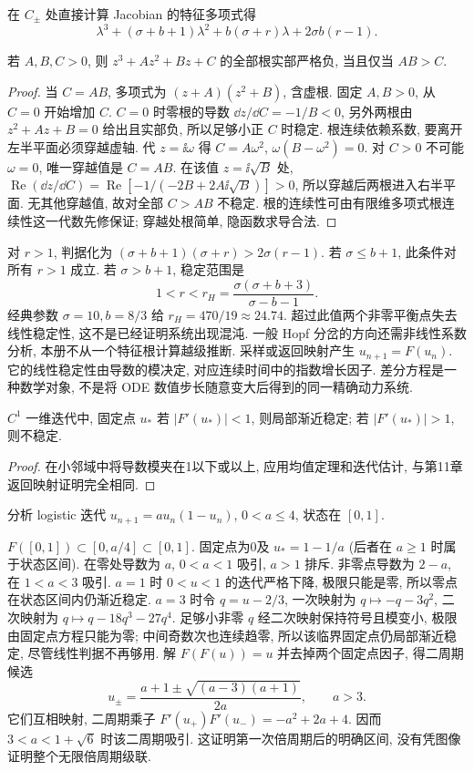 在 $C_\pm$ 处直接计算 Jacobian 的特征多项式得
\[
\lambda^3+(\sigma+b+1)\lambda^2+b(\sigma+r)\lambda+2\sigma b(r-1).
\]
\begin{lemma}[三次多项式判据]
若 $A,B,C>0$, 则 $z^3+Az^2+Bz+C$ 的全部根实部严格负, 当且仅当 $AB>C$.
\end{lemma}
\begin{proof}
当 $C=AB$, 多项式为 $(z+A)(z^2+B)$, 含虚根. 固定 $A,B>0$, 从 $C=0$ 开始增加 $C$. $C=0$ 时零根的导数 $\dd z/\dd C=-1/B<0$, 另外两根由 $z^2+Az+B=0$ 给出且实部负, 所以足够小正 $C$ 时稳定. 根连续依赖系数, 要离开左半平面必须穿越虚轴. 代 $z=\ii\omega$ 得 $C=A\omega^2$, $\omega(B-\omega^2)=0$. 对 $C>0$ 不可能 $\omega=0$, 唯一穿越值是 $C=AB$. 在该值 $z=\ii\sqrt B$ 处,
$\operatorname{Re}(\dd z/\dd C)=\operatorname{Re}[-1/(-2B+2A\ii\sqrt B)]>0$, 所以穿越后两根进入右半平面. 无其他穿越值, 故对全部 $C>AB$ 不稳定. 根的连续性可由有限维多项式根连续性这一代数先修保证; 穿越处根简单, 隐函数求导合法.
\end{proof}
对 $r>1$, 判据化为
$(\sigma+b+1)(\sigma+r)>2\sigma(r-1)$.
若 $\sigma\le b+1$, 此条件对所有 $r>1$ 成立. 若 $\sigma>b+1$, 稳定范围是
\[
1<r<r_H=\frac{\sigma(\sigma+b+3)}{\sigma-b-1}.
\]
经典参数 $\sigma=10,b=8/3$ 给 $r_H=470/19\approx24.74$. 超过此值两个非零平衡点失去线性稳定性, 这不是已经证明系统出现混沌. 一般 Hopf 分岔的方向还需非线性系数分析, 本册不从一个特征根计算越级推断.
采样或返回映射产生 $u_{n+1}=F(u_n)$. 它的线性稳定性由导数的模决定, 对应连续时间中的指数增长因子. 差分方程是一种数学对象, 不是将 ODE 数值步长随意变大后得到的同一精确动力系统.
\begin{proposition}
$C^1$ 一维迭代中, 固定点 $u_*$ 若 $|F'(u_*)|<1$, 则局部渐近稳定; 若 $|F'(u_*)|>1$, 则不稳定.
\end{proposition}
\begin{proof}在小邻域中将导数模夹在1以下或以上, 应用均值定理和迭代估计, 与第11章返回映射证明完全相同.\end{proof}
\begin{example}分析 logistic 迭代 $u_{n+1}=a u_n(1-u_n)$, $0<a\le4$, 状态在 $[0,1]$.\end{example}
\begin{solution}
$F([0,1])\subset[0,a/4]\subset[0,1]$. 固定点为0及 $u_*=1-1/a$ (后者在 $a\ge1$ 时属于状态区间). 在零处导数为 $a$, $0<a<1$ 吸引, $a>1$ 排斥. 非零点导数为 $2-a$, 在 $1<a<3$ 吸引. $a=1$ 时 $0<u<1$ 的迭代严格下降, 极限只能是零, 所以零点在状态区间内仍渐近稳定. $a=3$ 时令 $q=u-2/3$, 一次映射为 $q\mapsto-q-3q^2$, 二次映射为 $q\mapsto q-18q^3-27q^4$. 足够小非零 $q$ 经二次映射保持符号且模变小, 极限由固定点方程只能为零; 中间奇数次也连续趋零, 所以该临界固定点仍局部渐近稳定, 尽管线性判据不再够用. 解 $F(F(u))=u$ 并去掉两个固定点因子, 得二周期候选
\[
u_\pm=\frac{a+1\pm\sqrt{(a-3)(a+1)}}{2a},\qquad a>3.
\]
它们互相映射, 二周期乘子 $F'(u_+)F'(u_-)=-a^2+2a+4$. 因而 $3<a<1+\sqrt6$ 时该二周期吸引. 这证明第一次倍周期后的明确区间, 没有凭图像证明整个无限倍周期级联.
\end{solution}
